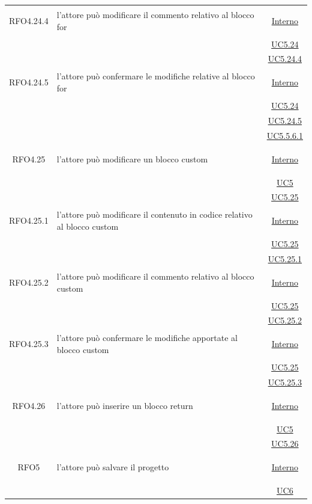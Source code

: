 \begin{longtable}{|c|>{\centering}m{7cm}|c|}
\hypertarget{RFO4.24.4}{RFO4.24.4} & l'attore può modificare il commento relativo al blocco for &  \hyperlink{Interno}{Interno}\\
& &\hyperref[UC5.24]{UC5.24}\\
& &\hyperref[UC5.24.4]{UC5.24.4}\\ \hline

\hypertarget{RFO4.24.5}{RFO4.24.5} & l'attore può confermare le modifiche relative al blocco for &  \hyperlink{Interno}{Interno}\\
& &\hyperref[UC5.24]{UC5.24}\\
& &\hyperref[UC5.24.5]{UC5.24.5}\\
& &\hyperref[UC5.5.6.1]{UC5.5.6.1}\\ \hline

\hypertarget{RFO4.25}{RFO4.25} & l'attore può modificare un blocco custom &  \hyperlink{Interno}{Interno}\\
& &\hyperref[UC5]{UC5}\\
& &\hyperref[UC5.25]{UC5.25}\\ \hline

\hypertarget{RFO4.25.1}{RFO4.25.1} & l'attore può modificare il contenuto in codice relativo al blocco custom &  \hyperlink{Interno}{Interno}\\
& &\hyperref[UC5.25]{UC5.25}\\
& &\hyperref[UC5.25.1]{UC5.25.1}\\ \hline

\hypertarget{RFO4.25.2}{RFO4.25.2} & l'attore può modificare il commento relativo al blocco custom &  \hyperlink{Interno}{Interno}\\
& &\hyperref[UC5.25]{UC5.25}\\
& &\hyperref[UC5.25.2]{UC5.25.2}\\ \hline

\hypertarget{RFO4.25.3}{RFO4.25.3} & l'attore può confermare le modifiche apportate al blocco custom &  \hyperlink{Interno}{Interno}\\
& &\hyperref[UC5.25]{UC5.25}\\
& &\hyperref[UC5.25.3]{UC5.25.3}\\ \hline

\hypertarget{RFO4.26}{RFO4.26} & l'attore può inserire un blocco return &  \hyperlink{Interno}{Interno}\\
& &\hyperref[UC5]{UC5}\\
& &\hyperref[UC5.26]{UC5.26}\\ \hline

\hypertarget{RFO5}{RFO5} & l'attore può salvare il progetto &  \hyperlink{Interno}{Interno}\\
& & \hyperref[UC6]{UC6}\\ \hline


\end{longtable}
